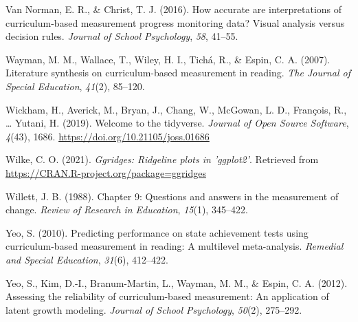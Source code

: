 \documentclass[
  english,
  man, fleqn, noextraspace]{apa6}
\begin{document}
\leavevmode\hypertarget{ref-vannorman2016}{}%
Van Norman, E. R., \& Christ, T. J. (2016). How accurate are interpretations of curriculum-based measurement progress monitoring data? Visual analysis versus decision rules. \emph{Journal of School Psychology}, \emph{58}, 41--55.

\leavevmode\hypertarget{ref-wayman2007}{}%
Wayman, M. M., Wallace, T., Wiley, H. I., Tichá, R., \& Espin, C. A. (2007). Literature synthesis on curriculum-based measurement in reading. \emph{The Journal of Special Education}, \emph{41}(2), 85--120.

\leavevmode\hypertarget{ref-R-tidyverse}{}%
Wickham, H., Averick, M., Bryan, J., Chang, W., McGowan, L. D., François, R., \ldots{} Yutani, H. (2019). Welcome to the tidyverse. \emph{Journal of Open Source Software}, \emph{4}(43), 1686. \url{https://doi.org/10.21105/joss.01686}

\leavevmode\hypertarget{ref-R-ggridges}{}%
Wilke, C. O. (2021). \emph{Ggridges: Ridgeline plots in 'ggplot2'}. Retrieved from \url{https://CRAN.R-project.org/package=ggridges}

\leavevmode\hypertarget{ref-willett1988chapter}{}%
Willett, J. B. (1988). Chapter 9: Questions and answers in the measurement of change. \emph{Review of Research in Education}, \emph{15}(1), 345--422.

\leavevmode\hypertarget{ref-yeo2010}{}%
Yeo, S. (2010). Predicting performance on state achievement tests using curriculum-based measurement in reading: A multilevel meta-analysis. \emph{Remedial and Special Education}, \emph{31}(6), 412--422.

\leavevmode\hypertarget{ref-yeoetal2012}{}%
Yeo, S., Kim, D.-I., Branum-Martin, L., Wayman, M. M., \& Espin, C. A. (2012). Assessing the reliability of curriculum-based measurement: An application of latent growth modeling. \emph{Journal of School Psychology}, \emph{50}(2), 275--292.

\endgroup
\end{document}
